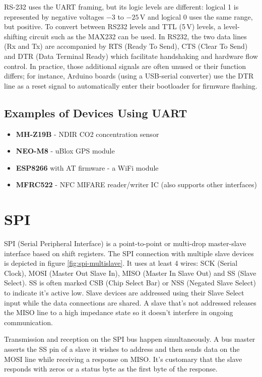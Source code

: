 RS-232 uses the UART framing, but its logic levels are different: logical 1 is represented by negative voltages $-3$ to $-25$\,V and logical 0 uses the same range, but positive. To convert between RS232 levels and TTL (5\,V) levels, a level-shifting circuit such as the MAX232 can be used. In RS232, the two data lines (Rx and Tx) are accompanied by RTS (Ready To Send), CTS (Clear To Send) and DTR (Data Terminal Ready) which facilitate handshaking and hardware flow control. In practice, those additional signals are often unused or their function differs; for instance, Arduino boards (using a USB-serial converter) use the DTR line as a reset signal to automatically enter their bootloader for firmware flashing.

\subsection{Examples of Devices Using UART}

\begin{itemize}
	\item \textbf{MH-Z19B} - NDIR CO2 concentration sensor 
	\item \textbf{NEO-M8} - uBlox GPS module
	\item \textbf{ESP8266} with AT firmware - a WiFi module
	\item \textbf{MFRC522} - NFC MIFARE reader/writer IC (also supports other interfaces)
\end{itemize}

\section{SPI} \label{sec:theory-spi}

SPI (Serial Peripheral Interface) is a point-to-point or multi-drop master-slave interface based on shift registers. The SPI connection with multiple slave devices is depicted in figure \ref{fig:spi-multislave}. It uses at least 4 wires: SCK (Serial Clock), MOSI (Master Out Slave In), MISO (Master In Slave Out) and SS (Slave Select). SS is often marked CSB (Chip Select Bar) or NSS (Negated Slave Select) to indicate it's active low. Slave devices are addressed using their Slave Select input while the data connections are shared. A slave that's not addressed releases the MISO line to a high impedance state so it doesn't interfere in ongoing communication.

Transmission and reception on the SPI bus happen simultaneously. A bus master asserts the SS pin of a slave it wishes to address and then sends data on the MOSI line while receiving a response on MISO. It's customary that the slave responds with zeros or a status byte as the first byte of the response.

